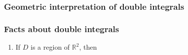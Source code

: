 \documentclass[12pt]{article}
\begin{document}
		\subsubsection{Geometric interpretation of double integrals}
		
		\subsubsection{Facts about double integrals}
		\begin{enumerate}
			\item If $D$ is a region of $\mathbb{R}^2$, then 
		\end{enumerate}
		
\end{document}
